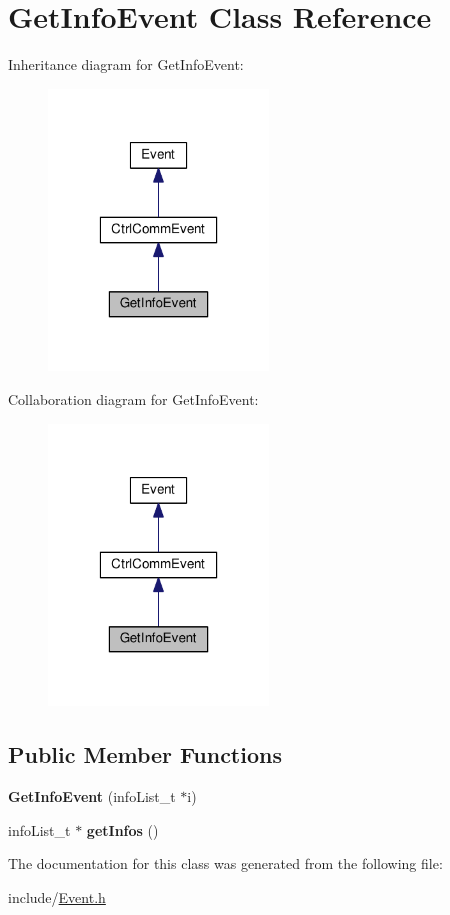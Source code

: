 \hypertarget{classGetInfoEvent}{}\section{Get\+Info\+Event Class Reference}
\label{classGetInfoEvent}


Inheritance diagram for Get\+Info\+Event\+:
\nopagebreak
\begin{figure}[H]
\begin{center}
\leavevmode
\includegraphics[width=166pt]{classGetInfoEvent__inherit__graph}
\end{center}
\end{figure}


Collaboration diagram for Get\+Info\+Event\+:
\nopagebreak
\begin{figure}[H]
\begin{center}
\leavevmode
\includegraphics[width=166pt]{classGetInfoEvent__coll__graph}
\end{center}
\end{figure}
\subsection*{Public Member Functions}
\begin{DoxyCompactItemize}
\item 
\mbox{\label{classGetInfoEvent_aadeef49fad32587ee4cf8642315222b3}} 
{\bfseries Get\+Info\+Event} (info\+List\+\_\+t $\ast$i)
\item 
\mbox{\label{classGetInfoEvent_ae48faba56cacad3f16c8a39abfef180d}} 
info\+List\+\_\+t $\ast$ {\bfseries get\+Infos} ()
\end{DoxyCompactItemize}


The documentation for this class was generated from the following file\+:\begin{DoxyCompactItemize}
\item 
include/\hyperlink{Event_8h}{Event.\+h}\end{DoxyCompactItemize}
